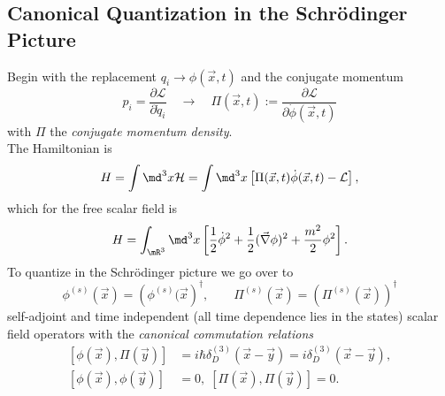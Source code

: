 \subsection{Canonical Quantization in the Schrödinger Picture}
Begin with the replacement $q_i \rightarrow \phi(\vec{x},t)$ and the conjugate momentum 
\begin{equation}
	p_i = \frac{\partial \mathcal{L}}{\partial \dot{q}_i} \quad \rightarrow \quad \Pi(\vec{x},t):= \frac{\partial \mathcal{L}}{\partial \dot{\phi}(\vec{x},t)}
\end{equation}
with $\Pi$ the \emph{conjugate momentum density}.\\
The Hamiltonian is
\begin{equation}
	H=\int \md^3x\mathcal{H} =\int \md^3 x \left[\Pi(\vec{x},t) \dot{\phi}(\vec{x},t) - \mathcal{L}\right],
\end{equation}
which for the free scalar field is
\begin{equation}
	H = \int_{\mR^3} \md^3 x \left[\frac{1}{2} \dot{\phi}^2 + \frac{1}{2} (\vec{\nabla} \phi)^2+ \frac{m^2}{2} \phi^2 \right].
\end{equation}
To quantize in the Schrödinger picture we go over to
\begin{equation}
	\phi^{(s)} (\vec{x}) = \left(\phi^{(s)}(\vec{x}\right)^{\dagger}, \qquad \Pi^{(s)}(\vec{x})=\left(\Pi^{(s)} (\vec{x})\right)^{\dagger}
\end{equation}
self-adjoint and time independent (all time dependence lies in the states) scalar field operators with the \emph{canonical commutation relations}
\begin{align}
	\left[\phi(\vec{x}),\Pi(\vec{y}) \right] &= i \hbar \delta^{(3)}_D (\vec{x}-\vec{y})= i \delta^{(3)}_D (\vec{x}-\vec{y}),\\
	 \left[\phi(\vec{x}), \phi(\vec{y})\right]&=0, \; \left[\Pi(\vec{x}), \Pi(\vec{y})\right]=0.
\end{align}

